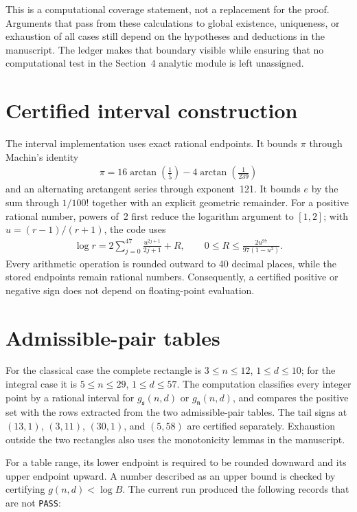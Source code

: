 \documentclass[12pt,a4paper]{amsart}
\theoremstyle{remark}
\theoremstyle{definition}
\begin{document}


This is a computational coverage statement, not a replacement for the proof.
Arguments that pass from these calculations to global existence, uniqueness,
or exhaustion of all cases still depend on the hypotheses and deductions in
the manuscript.  The ledger makes that boundary visible while ensuring that no
computational test in the Section~4 analytic module is left unassigned.

\section{Certified interval construction}

The interval implementation uses exact rational endpoints.  It bounds
\(\pi\) through Machin's identity
\begin{align*}
\pi=16\arctan\left(\frac{1}{5}\right)
-4\arctan\left(\frac{1}{239}\right)
\end{align*}
and an alternating arctangent series through exponent~121.  It bounds \(e\)
by the sum through \(1/100!\) together with an explicit geometric remainder.
For a positive rational number, powers of~2 first reduce the logarithm argument
to \([1,2]\); with \(u=(r-1)/(r+1)\), the code uses
\begin{align*}
\log r
=2\sum_{j=0}^{47}\frac{u^{2j+1}}{2j+1}+R,
\qquad
0\le R\le\frac{2u^{97}}{97(1-u^{2})}.
\end{align*}
Every arithmetic operation is rounded outward to 40 decimal places, while the
stored endpoints remain rational numbers.  Consequently, a certified positive
or negative sign does not depend on floating-point evaluation.

\section{Admissible-pair tables}

For the classical case the complete rectangle is
\(3\le n\le12\), \(1\le d\le10\); for the integral case it is
\(5\le n\le29\), \(1\le d\le57\).  The computation classifies every
integer point by a rational interval for
\(g_{\mathfrak{s}}(n,d)\) or \(g_{\mathfrak{n}}(n,d)\), and compares the
positive set with the rows extracted from the two admissible-pair tables.
The tail signs at \((13,1)\), \((3,11)\), \((30,1)\), and \((5,58)\)
are certified separately.  Exhaustion outside the two rectangles also uses the
monotonicity lemmas in the manuscript.

For a table range, its lower endpoint is required to be rounded downward and
its upper endpoint upward.  A number described as an upper bound is checked by
certifying \(g(n,d)<\log B\).  The current run produced the following records
that are not \texttt{PASS}:
\end{document}
